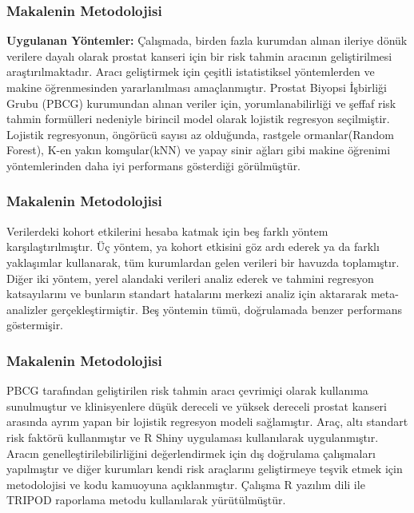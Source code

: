 \documentclass{beamer}
\begin{document}
\begin{frame}
\frametitle{Makalenin Metodolojisi}
\textbf{Uygulanan Yöntemler: }
Çalışmada, birden fazla kurumdan alınan ileriye dönük verilere dayalı olarak prostat kanseri için bir risk tahmin aracının geliştirilmesi araştırılmaktadır. Aracı geliştirmek için çeşitli istatistiksel yöntemlerden ve makine öğrenmesinden yararlanılması amaçlanmıştır. Prostat Biyopsi İşbirliği Grubu (PBCG) kurumundan alınan veriler için, yorumlanabilirliği ve şeffaf risk tahmin formülleri nedeniyle birincil model olarak lojistik regresyon seçilmiştir. Lojistik regresyonun, öngörücü sayısı az olduğunda, rastgele ormanlar(Random Forest), K-en yakın komşular(kNN) ve yapay sinir ağları gibi makine öğrenimi yöntemlerinden daha iyi performans gösterdiği görülmüştür.

\end{frame}

\begin{frame}
\frametitle{Makalenin Metodolojisi}
Verilerdeki kohort etkilerini hesaba katmak için beş farklı yöntem karşılaştırılmıştır. Üç yöntem, ya kohort etkisini göz ardı ederek ya da farklı yaklaşımlar kullanarak, tüm kurumlardan gelen verileri bir havuzda toplamıştır. Diğer iki yöntem, yerel alandaki verileri analiz ederek ve tahmini regresyon katsayılarını ve bunların standart hatalarını merkezi analiz için aktararak meta-analizler gerçekleştirmiştir. Beş yöntemin tümü, doğrulamada benzer performans göstermişir.

\end{frame}

\begin{frame}
\frametitle{Makalenin Metodolojisi}
PBCG tarafından geliştirilen risk tahmin aracı çevrimiçi olarak kullanıma sunulmuştur ve klinisyenlere düşük dereceli ve yüksek dereceli prostat kanseri arasında ayrım yapan bir lojistik regresyon modeli sağlamıştır. Araç, altı standart risk faktörü kullanmıştır ve R Shiny uygulaması kullanılarak uygulanmıştır. Aracın genelleştirilebilirliğini değerlendirmek için dış doğrulama çalışmaları yapılmıştır ve diğer kurumları kendi risk araçlarını geliştirmeye teşvik etmek için metodolojisi ve kodu kamuoyuna açıklanmıştır. Çalışma R yazılım dili ile TRIPOD raporlama metodu kullanılarak yürütülmüştür.

\end{frame}
\end{document}

